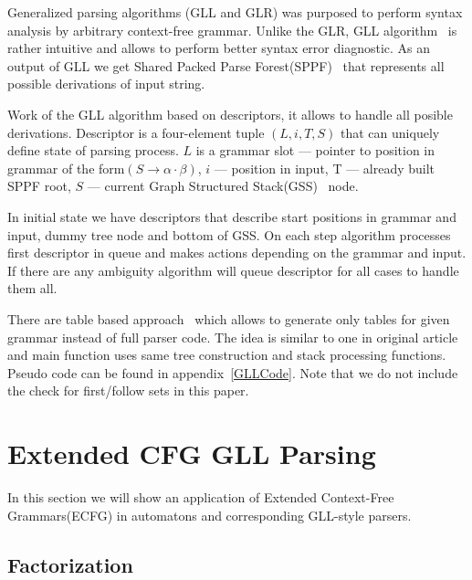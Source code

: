 \documentclass[runningheads,a4paper]{llncs}
\begin{document}
Generalized parsing algorithms (GLL and GLR) was purposed to perform syntax analysis by arbitrary context-free 
grammar. Unlike the GLR, GLL algorithm~\cite{scott2010gll} is rather intuitive and allows to perform better syntax error diagnostic.
As an output of GLL we get Shared Packed Parse Forest(SPPF)~\cite{scott2013gll} that represents all possible derivations of input string.

Work of the GLL algorithm based on descriptors, it allows to handle all posible derivations.
Descriptor is a four-element tuple $(L,i, T, S)$ that can uniquely define state of parsing process. 
$L$ is a grammar slot --- pointer to position in grammar of the form$(S \to \alpha \cdot \beta)$, $i$ --- position in input,
T --- already built SPPF root, $S$ --- current Graph Structured Stack(GSS)~\cite{GSS} node.

In initial state we have descriptors that describe start positions in grammar and input, dummy tree node and bottom of GSS.
On each step algorithm processes first descriptor in queue and makes actions depending on the grammar and input.
If there are any ambiguity algorithm will queue descriptor for all cases to handle them all. 

There are table based approach~\cite{ragozina} which allows to generate only tables for given grammar instead of full parser code.
The idea is similar to one in original article and main function uses same tree construction and stack processing functions.
Pseudo code can be found in appendix~\ref{GLLCode}. Note that we do not include the check for first/follow sets in this paper.




\section{Extended CFG GLL Parsing}%

In this section we will show an application of Extended Context-Free Grammars(ECFG) in automatons and corresponding GLL-style parsers.

\subsection{Factorization}%
\end{document}
